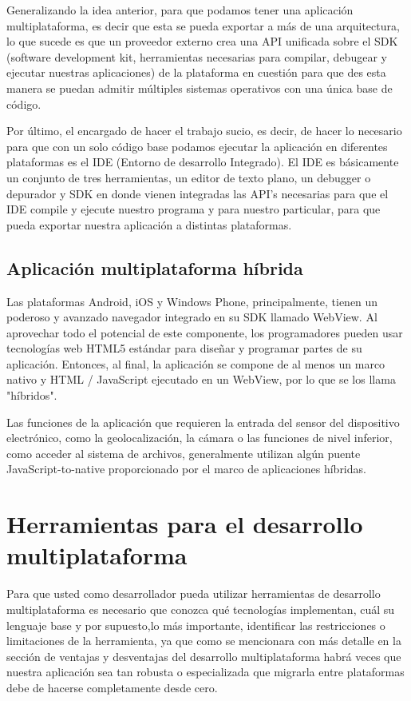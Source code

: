 \documentclass[a4paper,12pt]{mylib/publicacion}
\begin{document}
Generalizando la idea anterior, para que podamos tener una aplicación multiplataforma, es decir que esta se pueda exportar a más de una arquitectura, lo que sucede es que un proveedor externo crea una API unificada sobre el SDK (software development kit, herramientas
necesarias para compilar, debugear y ejecutar nuestras aplicaciones) de la plataforma en cuestión para que des esta manera se puedan admitir múltiples sistemas operativos con una única base de código.

Por último, el encargado de hacer el trabajo sucio, es decir, de hacer lo necesario para que con un solo código base podamos ejecutar la aplicación en diferentes plataformas es el IDE (Entorno de desarrollo Integrado).
El IDE es básicamente un conjunto de tres herramientas, un editor de texto plano, un debugger o depurador y SDK en donde vienen integradas las API’s necesarias para que el IDE compile y ejecute nuestro programa y para nuestro particular, para que pueda exportar nuestra aplicación a distintas plataformas.

\subsection{Aplicación multiplataforma híbrida}

Las plataformas Android, iOS y Windows Phone, principalmente, tienen un poderoso y avanzado navegador integrado en su SDK llamado WebView. Al aprovechar todo el potencial de este componente, los programadores pueden usar tecnologías web HTML5 estándar para diseñar y programar partes de su aplicación. Entonces, al final, la aplicación se compone de al menos un marco nativo y HTML / JavaScript ejecutado en un WebView, por
lo que se los llama "híbridos".

Las funciones de la aplicación que requieren la entrada del sensor del dispositivo electrónico, como la geolocalización, la cámara o las funciones de nivel inferior, como acceder al sistema de archivos, generalmente utilizan algún puente JavaScript-to-native proporcionado por el
marco de aplicaciones híbridas.

\section{Herramientas para el desarrollo multiplataforma}

Para que usted como desarrollador pueda utilizar herramientas de desarrollo multiplataforma es necesario que conozca qué tecnologías implementan, cuál su lenguaje base y por supuesto,lo más importante, identificar las restricciones o limitaciones de la herramienta, ya que como se mencionara con más detalle en la sección de ventajas y desventajas del desarrollo
multiplataforma habrá veces que nuestra aplicación sea tan robusta o especializada que migrarla entre plataformas debe de hacerse completamente desde cero.
\end{document}
